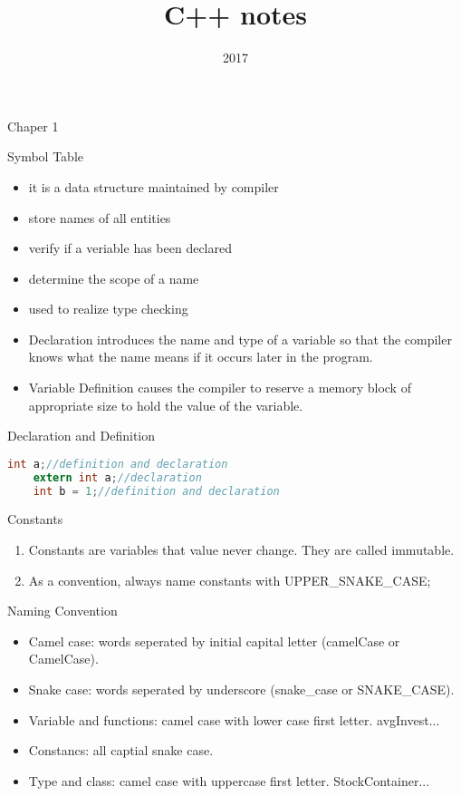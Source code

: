 \documentclass[a4paper]{tufte-handout}
\title{C++ notes}
\date{2017}
\begin{document}
\maketitle

Chaper 1
\begin{projects}
  Symbol Table
  \begin{itemize}
  \item it is a data structure maintained by compiler
  \item store names of all entities
  \item verify if a veriable has been declared
  \item determine the scope of a name
  \item used to realize type checking
  \end{itemize}

  \begin{itemize}
  \item Declaration introduces the name and type of a variable so that the compiler knows what the name means if it occurs later in the program.
  \item Variable Definition causes the compiler to reserve a memory block of appropriate size to hold the value of the variable.
  \end{itemize}

  Declaration and Definition
  \begin{lstlisting}[language=C]
    int a;//definition and declaration
    extern int a;//declaration
    int b = 1;//definition and declaration
  \end{lstlisting}
\end{projects}

Constants
\begin{enumerate}
\item Constants are variables that value never change. They are called immutable.
\item As a convention, always name constants with UPPER\_SNAKE\_CASE;
\end{enumerate}

Naming Convention
\begin{itemize}
\item Camel case: words seperated by initial capital letter (camelCase or CamelCase).
\item Snake case: words seperated by underscore (snake\_case or SNAKE\_CASE).
\item Variable and functions: camel case with lower case first letter. avgInvest...
\item Constancs: all captial snake case.
\item Type and class: camel case with uppercase first letter. StockContainer...
\end{itemize}
\end{document}
